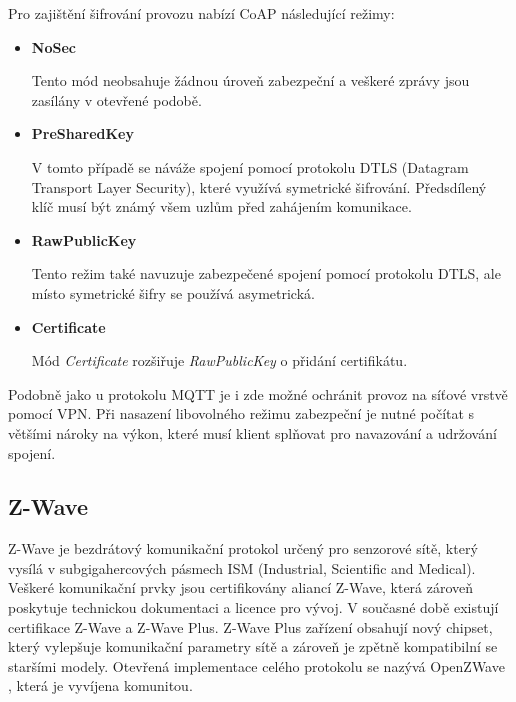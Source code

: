    Pro zajištění šifrování provozu nabízí CoAP následující režimy:
   \begin{itemize}
    \item \textbf{NoSec}
    
    Tento mód neobsahuje žádnou úroveň zabezpeční a veškeré zprávy jsou zasílány
    v otevřené podobě. 
    
    \item \textbf{PreSharedKey}
    
    V tomto případě se náváže spojení pomocí protokolu DTLS (Datagram Transport
    Layer Security), které využívá symetrické šifrování. Předsdílený klíč musí
    být známý všem uzlům před zahájením komunikace. 
    
    \item \textbf{RawPublicKey}
    
    Tento režim také navuzuje zabezpečené spojení pomocí protokolu DTLS, ale místo
    symetrické šifry se používá asymetrická.
    
    \item \textbf{Certificate}
    
    Mód \textit{Certificate} rozšiřuje \textit{RawPublicKey} o přidání certifikátu.
   \end{itemize}

   Podobně jako u protokolu MQTT je i zde možné ochránit provoz na síťové
   vrstvě pomocí VPN. Při nasazení libovolného režimu zabezpeční je nutné počítat 
   s většími nároky na výkon, které musí klient splňovat pro navazování a udržování 
   spojení. \cite{coap}
   
  \subsection{Z-Wave}
  
  Z-Wave je bezdrátový komunikační protokol určený pro senzorové sítě, který vysílá 
  v subgigahercových pásmech ISM (Industrial, Scientific and Medical). Veškeré komunikační
  prvky jsou certifikovány aliancí Z-Wave, která zároveň poskytuje technickou dokumentaci a
  licence pro vývoj. V současné době existují certifikace Z-Wave a Z-Wave Plus. 
  Z-Wave Plus zařízení obsahují nový chipset, který vylepšuje komunikační parametry
  sítě a zároveň je zpětně kompatibilní se staršími modely. \cite{z-plus}
  Otevřená implementace celého protokolu se nazývá OpenZWave \cite{openzwave}, která
  je vyvíjena komunitou. \cite{cesnet-survey} 
 
